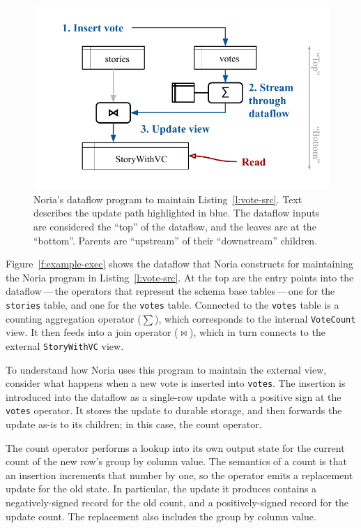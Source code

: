 \begin{figure}[t]
  \centering
  \includegraphics{diagrams/Example Execution.pdf}
  \caption{Noria's dataflow program to maintain Listing~\ref{l:vote-src}. Text
  describes the update path highlighted in blue. The dataflow inputs are
  considered the ``top'' of the dataflow, and the leaves are at the ``bottom''.
  Parents are ``upstream'' of their ``downstream'' children.}
  \label{f:example-exec}
\end{figure}

Figure~\vref{f:example-exec} shows the dataflow that Noria constructs for
maintaining the Noria program in Listing~\vref{l:vote-src}. At the top are the
entry points into the dataflow\,---\,the operators that represent the schema
base tables\,---\,one for the \texttt{stories} table, and one for the
\texttt{votes} table. Connected to the \texttt{votes} table is a counting
aggregation operator ($\sum$), which corresponds to the internal
\texttt{VoteCount} view. It then feeds into a join operator ($\bowtie$), which
in turn connects to the external \texttt{StoryWithVC} view.

To understand how Noria uses this program to maintain the external view,
consider what happens when a new vote is inserted into \texttt{votes}. The
insertion is introduced into the dataflow as a single-row update with a positive
sign at the \texttt{votes} operator. It stores the update to durable storage,
and then forwards the update as-is to its children; in this case, the count
operator.

The count operator performs a lookup into its own output state for the current
count of the new row's group by column value. The semantics of a count is that
an insertion increments that number by one, so the operator emits a replacement
update for the old state. In particular, the update it produces contains a
negatively-signed record for the old count, and a positively-signed record for
the update count. The replacement also includes the group by column value.

